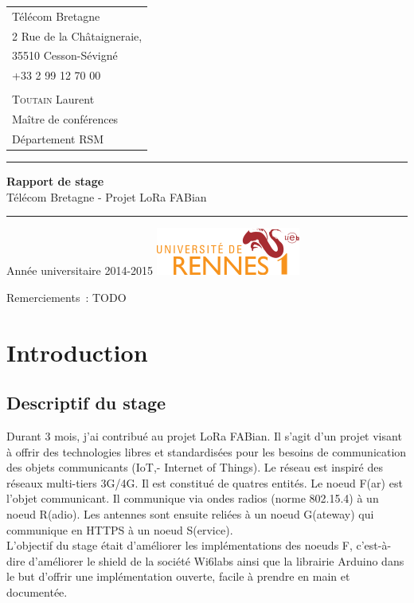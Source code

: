 \documentclass{article}
\begin{document}
\begin{titlepage}
\begin{tabular}{l}
		Télécom Bretagne\\
		2 Rue de la Châtaigneraie,\\
		35510 Cesson-Sévigné\\
		+33 2 99 12 70 00\\
		\\
		\textsc{Toutain} Laurent\\
		Maître de conférences\\
		Département RSM
	\end{tabular}
	\vfill
	\begin{center}
		\vspace{0.5cm}\hrule\vspace{0.5cm}
		\LARGE{\textbf{Rapport de stage}}\\
		\Large{Télécom Bretagne - Projet LoRa FABian}
		\vspace{0.5cm}\hrule
	\end{center}
	\vfill
	\begin{flushleft}
		\Large{Année universitaire 2014-2015}
		\hspace{4cm}
		\includegraphics[scale=0.6]{univ}
	\end{flushleft}
\end{titlepage}

\begin{titlepage}
\vspace{\fill}
\begin{flushright}
Remerciements~:
TODO
\end{flushright}
\vspace{\fill}
\end{titlepage}

\thispagestyle{empty}
\tableofcontents
\listoffigures
\newpage
\setcounter{page}{1}

\section{Introduction}
\subsection{Descriptif du stage}
Durant 3 mois, j'ai contribué au projet LoRa FABian. Il s'agit d'un projet visant à offrir des technologies libres et standardisées pour les besoins de communication des objets communicants (IoT,- Internet of Things). Le réseau est inspiré des réseaux multi-tiers 3G/4G. Il est constitué de quatres entités. Le noeud F(ar) est l'objet communicant. Il communique via ondes radios (norme 802.15.4) à un noeud R(adio). Les antennes sont ensuite reliées à un noeud G(ateway) qui communique en HTTPS à un noeud S(ervice).\\
L'objectif du stage était d'améliorer les implémentations des noeuds F, c'est-à-dire d'améliorer le shield de la société Wi6labs ainsi que la librairie Arduino dans le but d'offrir une implémentation ouverte, facile à prendre en main et documentée.
\end{document}
